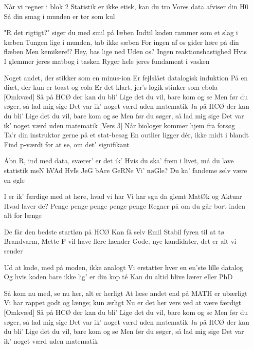 \documentclass[a4paper,11pt]{article}
\begin{document}
\begin{song}
%
Når vi regner i blok 2 
Statistik er ikke etisk, kan du tro 
Vores data afviser din H0 
Så din smag i munden er tør som kul 

%
"R det rigtigt?" siger du med smil på læben 
Indtil koden rammer som et slag i kæben
Tungen lige i munden, tab ikke sæben
For ingen af os gider høre på din flæben
%
Men kemikere!? Hey, bas lige ned
Uden os? Ingen reaktionshastighed
Hvis I glemmer jeres matbog i tasken
Ryger hele jeres fundament i vasken

Noget andet, der stikker som en minus-ion
Er fejlslået    datalogisk induktion
På en diæt, der kun er toast og cola
Er det klart, jer’s logik stinker som ebola
[Omkvæd]%
Så på HCØ der kan du bli'	
Lige det du vil, bare kom og se
Men før du søger, så lad mig sige
Det var ik' noget værd uden matematik
%
Ja på HCØ der kan du bli'
Lige det du vil, bare kom og se
Men før du søger, så lad mig sige
Det var ik' noget værd uden matematik
[Vers 3]%
Når biologer kommer hjem fra forsøg
Ta’r din instruktor gerne på et stat-besøg
En outlier ligger dér, ikke midt i blandt
Find p-værdi for at se, om det’ signifikant

Åbn R, ind med data, sværer’ er det ik’
Hvis du ska’ frem i livet, må du lave statistik
%
meN hVAd HvIs JeG bAre GeRNe Vi’ nøGle?
%
Du ka’ fandeme selv være en øgle

%
I er ik’ færdige med at høre, hvad vi har
Vi har sgu da glemt MatØk og Aktuar
Hvad laver de? Penge penge penge penge penge
Regner på om du går bort inden alt for længe

De får den bedste startløn på HCØ
Kan få selv Emil Stabil fyren til at tø
Brandvarm, Mette F vil have flere hænder
Gode, nye kandidater, det er alt vi sender

Ud at kode, med på moden, ikke analogt
Vi erstatter hver en en’ste lille datalog
Og hvis koden bare ikke lig’ er din kop té
Kan du altid blive lærer eller PhD

%
Så kom nu med, se nu her, alt er herligt
At læse andet end på MATH er ubærligt
Vi har rappet godt og længe; kun ærligt
Nu er det her vers ved at være færdigt
[Omkvæd]%
Så på HCØ der kan du bli'	
Lige det du vil, bare kom og se
Men før du søger, så lad mig sige
Det var ik' noget værd uden matematik
%
Ja på HCØ der kan du bli'
Lige det du vil, bare kom og se
Men før du søger, så lad mig sige
Det var ik' noget værd uden matematik
\end{song}
\end{document}
